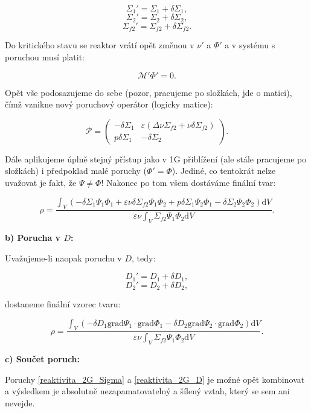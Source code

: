 $$ \Sigma_1' = \Sigma_1 + \delta \Sigma_1, $$
$$ \Sigma_2' = \Sigma_2 + \delta \Sigma_2, $$
$$ \Sigma_{f2}' = \Sigma_{f2} + \delta \Sigma_{f2}. $$

Do kritického stavu se reaktor vrátí opět změnou v $\nu'$ a $\Phi'$ a v systému s poruchou musí platit:

$$ \mathcal{M'} \Phi' = 0. $$

Opět vše podosazujeme do sebe (pozor, pracujeme po složkách, jde o matici), čímž vznikne nový poruchový operátor (logicky matice):

$$ \mathcal{P} = \begin{pmatrix} - \delta \Sigma_1 & \varepsilon(\Delta \nu \Sigma_{f2} + \nu \delta \Sigma_{f2}) \\ p \delta \Sigma_1 & - \delta \Sigma_2 \end{pmatrix}. $$

Dále aplikujeme úplně stejný přístup jako v 1G přiblížení (ale stále pracujeme po složkách) i předpoklad malé poruchy ($\Phi' = \Phi$). Jediné, co tentokrát nelze uvažovat je fakt, že $\Psi \neq \Phi$! Nakonec po tom všem dostáváme finální tvar:

\begin{equation}
  \boxed{
  \rho = \dfrac{\int_V \left ( - \delta \Sigma_1 \Psi_1 \Phi_1 + \varepsilon \nu \delta \Sigma_{f2} \Psi_1 \Phi_2 + p \delta \Sigma_1 \Psi_2 \Phi_1 - \delta \Sigma_2 \Psi_2 \Phi_2 \right ) \text{d}V}{\varepsilon \nu \int_V \Sigma_{f2} \Psi_1 \Phi_2 \text{d}V}.
  \label{reaktivita_2G_Sigma}}
\end{equation}

\textbf{b) Porucha v $D$:}

Uvažujeme-li naopak poruchu v $D$, tedy:

$$ D_1' = D_1 + \delta D_1, $$
$$ D_2' = D_2 + \delta D_2, $$

dostaneme finální vzorec tvaru:

\begin{equation}
  \boxed{
  \rho = \dfrac{\int_V \left ( - \delta D_1 \text{grad} \Psi_1 \cdot \text{grad} \Phi_1 - \delta D_2 \text{grad} \Psi_2 \cdot \text{grad} \Phi_2 \right ) \text{d}V}{\varepsilon \nu \int_V \Sigma_{f2} \Psi_1 \Phi_2 \text{d}V}.
  \label{reaktivita_2G_D}}
\end{equation}

\textbf{c) Součet poruch:}

Poruchy \eqref{reaktivita_2G_Sigma} a \eqref{reaktivita_2G_D} je možné opět kombinovat a výsledkem je absolutně nezapamatovatelný a šílený vztah, který se sem ani nevejde.

